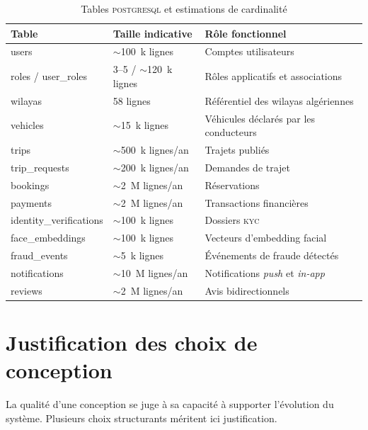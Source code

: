 \documentclass[12pt, a4paper, oneside]{report}
\begin{document}
\begin{table}[H]
\centering
\footnotesize
\begin{tabularx}{\textwidth}{|l|l|X|}
\hline
\rowcolor{rohlight}
\textbf{Table} & \textbf{Taille indicative} & \textbf{Rôle fonctionnel} \\
\hline
users & $\sim$100~k lignes & Comptes utilisateurs \\
\hline
roles / user\_roles & 3--5 / $\sim$120~k lignes & Rôles applicatifs et associations \\
\hline
wilayas & 58 lignes & Référentiel des wilayas algériennes \\
\hline
vehicles & $\sim$15~k lignes & Véhicules déclarés par les conducteurs \\
\hline
trips & $\sim$500~k lignes/an & Trajets publiés \\
\hline
trip\_requests & $\sim$200~k lignes/an & Demandes de trajet \\
\hline
bookings & $\sim$2~M lignes/an & Réservations \\
\hline
payments & $\sim$2~M lignes/an & Transactions financières \\
\hline
identity\_verifications & $\sim$100~k lignes & Dossiers \textsc{kyc} \\
\hline
face\_embeddings & $\sim$100~k lignes & Vecteurs d'embedding facial \\
\hline
fraud\_events & $\sim$5~k lignes & Événements de fraude détectés \\
\hline
notifications & $\sim$10~M lignes/an & Notifications \textit{push} et \textit{in-app} \\
\hline
reviews & $\sim$2~M lignes/an & Avis bidirectionnels \\
\hline
\end{tabularx}
  \caption{Tables \textsc{postgresql} et estimations de cardinalité}
  \label{tab:tables}
\end{table}

\section{Justification des choix de conception}
\label{sec:justification}

La qualité d'une conception se juge à sa capacité à supporter l'évolution du système. Plusieurs choix structurants méritent ici justification.
\end{document}
